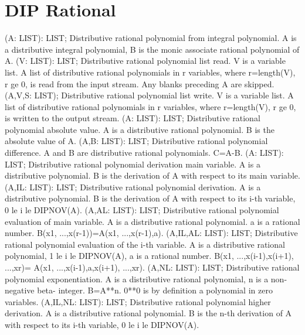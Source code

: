 \section{ DIP Rational  } 
 (A: LIST): LIST; \eproc
\bcom Distributive rational polynomial from integral polynomial.
A is a distributive integral polynomial, B is the monic associate
rational polynomial of A.  \ecom 
{} (V: LIST): LIST; \eproc
\bcom Distributive rational polynomial list read. V is a
variable list. A list of distributive rational polynomials
in r variables, where r=length(V), r ge 0, is read from
the input stream. Any blanks preceding A are skipped.  \ecom 
{} (A,V,S: LIST); \eproc
\bcom Distributive rational polynomial list write. V is a
variable list. A list of distributive rational polynomials
in r variables, where r=length(V), r ge 0, is written to
the output stream.  \ecom 
{} (A: LIST): LIST; \eproc
\bcom Distributive rational polynomial absolute value. A is a
distributive rational polynomial. B is the absolute value of A. \ecom 
{} (A,B: LIST): LIST; \eproc
\bcom Distributive rational polynomial difference. A and B are
distributive rational polynomials. C=A-B. \ecom 
{} (A: LIST): LIST; \eproc
\bcom Distributive rational polynomial derivation main variable.
A is a distributive polynomial. B is the derivation of A
with respect to its main variable. \ecom 
{} (A,IL: LIST): LIST; \eproc
\bcom Distributive rational polynomial derivation. A is a distributive
polynomial. B is the derivation of A with respect to its i-th
variable, 0 le i le DIPNOV(A). \ecom 
{} (A,AL: LIST): LIST; \eproc
\bcom Distributive rational polynomial evaluation of main variable.
A is a distributive rational polynomial. a is a rational number.
B(x1, ...,x(r-1))=A(x1, ...,x(r-1),a).  \ecom 
{} (A,IL,AL: LIST): LIST; \eproc
\bcom Distributive rational polynomial evaluation of the i-th variable.
A is a distributive rational polynomial, 1 le i le DIPNOV(A),
a is a rational number. B(x1, ...,x(i-1),x(i+1), ...,xr)=
A(x1, ...,x(i-1),a,x(i+1), ...,xr).  \ecom 
{} (A,NL: LIST): LIST; \eproc
\bcom Distributive rational polynomial exponentiation. A is a
distributive rational polynomial, n is a non-negative beta-
integer. B=A**n. 0**0 is by definition a polynomial in
zero variables.  \ecom 
{} (A,IL,NL: LIST): LIST; \eproc
\bcom Distributive rational polynomial higher derivation. A is a
distributive rational polynomial. B is the n-th derivation
of A with respect to its i-th variable, 0 le i le DIPNOV(A).  \ecom 
